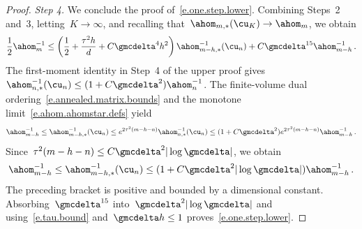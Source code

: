 \documentclass[11pt]{amsart}
\begin{document}
\begin{proof}
\smallskip

	\emph{Step 4.} We conclude the proof of~\eqref{e.one.step.lower}. Combining Steps~2 and~3, letting~$K\to\infty$, and recalling that~$\ahom_{m,*}(\cu_K)\to\ahom_m$, we obtain
	\begin{equation*}
		\frac12\ahom_m^{-1}
		\leq
		\left(\frac12+\frac{\tau^2h}{d}+C\gmcdelta^4h^2\right)
		\ahom_{m-h,*}^{-1}(\cu_n)
		+C\gmcdelta^{15}\ahom_{m-h}^{-1}\,.
	\end{equation*}
    The first-moment identity in Step~4 of the upper proof gives~$\ahom_{n,*}^{-1}(\cu_n)\leq(1+C\gmcdelta^2)\ahom_n^{-1}$. The finite-volume dual ordering~\eqref{e.annealed.matrix.bounds} and the monotone limit~\eqref{e.ahom.ahomstar.defs} yield
\begin{equation*}
	\ahom_{m-h}^{-1}\leq\ahom_{m-h,*}^{-1}(\cu_n)
	\leq e^{2\tau^2(m-h-n)}\ahom_{n,*}^{-1}(\cu_n)
	\leq(1+C\gmcdelta^2)e^{2\tau^2(m-h-n)}\ahom_{m-h}^{-1}\,.
\end{equation*}
Since~$\tau^2(m-h-n)\leq C\gmcdelta^2|\log\gmcdelta|$, we obtain
\begin{equation*}
	\ahom_{m-h}^{-1}\leq\ahom_{m-h,*}^{-1}(\cu_n)
	\leq(1+C\gmcdelta^2|\log\gmcdelta|)\ahom_{m-h}^{-1}\,.
\end{equation*}
The preceding bracket is positive and bounded by a dimensional constant. Absorbing~$\gmcdelta^{15}$ into~$\gmcdelta^2|\log\gmcdelta|$ and using~\eqref{e.tau.bound} and~$\gmcdelta h\leq1$ proves~\eqref{e.one.step.lower}.
\end{proof}
\end{document}
